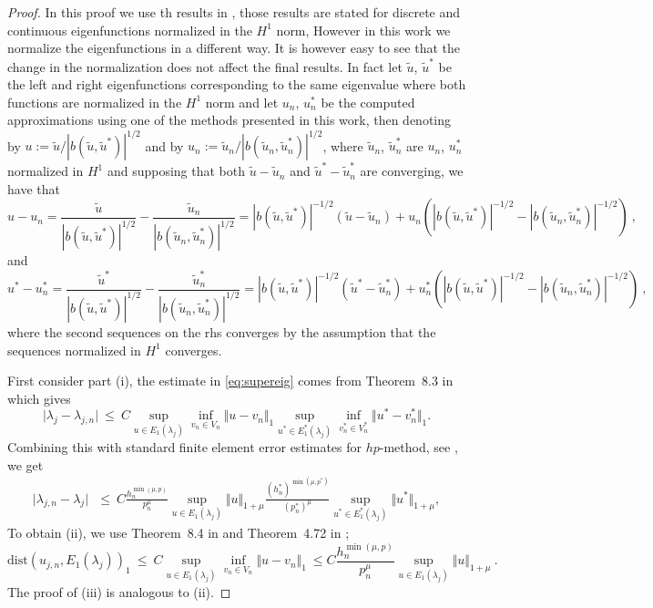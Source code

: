 \documentclass[preprint,12pt]{elsarticle}
\begin{document}
\begin{proof}

In this proof we use th results in \cite{babuska}, those results are stated for discrete and continuous eigenfunctions normalized in the $H^1$ norm, However in this work we normalize the eigenfunctions in a different way. It is however easy to see that the change in the normalization does not affect the final results. In fact let $\tilde u$, $\tilde u^*$ be the left and right eigenfunctions corresponding to the same eigenvalue where both functions are normalized in the $H^1$ norm and let $u_n$, $u_n^*$ be the computed approximations using one of the methods presented in this work, 
then
 denoting by $ u := \tilde u /|b(\tilde u,\tilde u^*)|^{1/2}$ and by 
$ u_n := \tilde u_n/|b(\tilde u_n,\tilde u_n^*)|^{1/2}$, where $\tilde u_n$, $\tilde u_n^*$ are $u_n$, $u_n^*$ normalized in $H^1$  and supposing that both $\tilde u-\tilde u_n$ and $\tilde u^*-\tilde u_n^*$ are converging, we have that
$$
u - u_n = \frac{\tilde u}{|b(\tilde u,\tilde u^*)|^{1/2}}-\frac{\tilde u_n}{|b(\tilde u_n,\tilde u_n^*)|^{1/2}} =
|b(\tilde u,\tilde u^*)|^{-1/2}(\tilde u-\tilde u_n)+ u_n( |b(\tilde u,\tilde u^*)|^{-1/2}- |b(\tilde u_n,\tilde u_n^*)|^{-1/2})\ ,
$$
and
$$
u^* - u_n^* = \frac{\tilde u^*}{|b(\tilde u,\tilde u^*)|^{1/2}}-\frac{\tilde u_n^*}{|b(\tilde u_n,\tilde u_n^*)|^{1/2}} =
|b(\tilde u,\tilde u^*)|^{-1/2}(\tilde u^*-\tilde u_n^*)+ u_n^*( |b(\tilde u,\tilde u^*)|^{-1/2}- |b(\tilde u_n,\tilde u_n^*)|^{-1/2})\ ,
$$
where the second sequences on the rhs converges by the assumption that the sequences normalized in $H^1$ converges.


First consider part (i), the estimate in \eqref{eq:supereig} comes from  
Theorem~8.3 in \cite{babuska} which gives  
$$ 
\vert \lambda_j - \lambda_{j,n} \vert \ \leq \  C \sup_{u \in
  E_1(\lambda_j)} \inf_{v_n \in V_n} \Vert u - v_n \Vert_1 \sup_{u^* \in
  E_1^*(\lambda_j)} \inf_{v_n^* \in V_n^*} \Vert u^* - v_n^* \Vert_1. 
  $$
Combining this with standard finite element error
estimates for $hp$-method, see \cite[Theorem~4.72]{schwab}, we get  
\begin{eqnarray}
\vert \lambda_{j,n} - \lambda_j \vert \  \  
\ \leq \ C \frac{h_n^{\min(\mu,p)} }{p_n^{\mu}} \sup_{u \in
  E_1(\lambda_j)} \Vert u \Vert_{1+\mu}\frac{(h_n^*)^{\min(\mu,p^*)} }{(p_n^*)^{\mu}} \sup_{u^* \in
  E_1^*(\lambda_j)} \Vert u^* \Vert_{1+\mu} ,  \label{eq:second_est} 
  \end{eqnarray}
To obtain  (ii), we use Theorem~8.4 in \cite{babuska} and Theorem~4.72 in \cite{schwab};
$$
\mathrm{dist}(
u_{j,n},E_1(\lambda_j))_{1}\ \leq \  C \sup_{u \in
  E_1(\lambda_j)} \inf_{v_n \in V_n} \Vert u - v_n \Vert_1 \ \leq
C \frac{h_n^{\min(\mu,p)} }{p_n^{\mu}} \sup_{u \in
  E_1(\lambda_j)} \Vert u \Vert_{1+\mu}\ .
$$
The proof of (iii) is analogous to (ii).
\end{proof}
\end{document}
